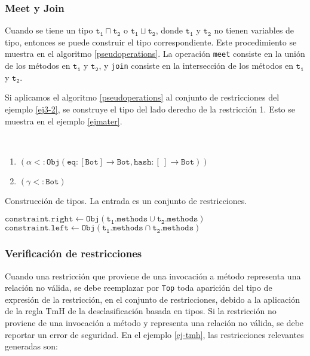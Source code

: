 \subsubsection{Meet y Join}
Cuando se tiene un tipo $\mathtt{t_1 \sqcap t_2}$ o $\mathtt{t_1 \sqcup t_2}$, donde $\mathtt{t_1}$ y $\mathtt{t_2}$ no tienen variables de tipo, entonces se puede construir el tipo correspondiente. Este procedimiento se muestra en el algoritmo \ref{pseudoperations}. La operación \texttt{meet} consiste en la unión de los métodos en $\mathtt{t_1}$ y $\mathtt{t_2}$, y \texttt{join} consiste en la intersección de los métodos en $\mathtt{t_1}$ y $\mathtt{t_2}$.

Si aplicamos el algoritmo \ref{pseudoperations} al conjunto de restricciones del ejemplo \ref{ej3-2}, se construye el tipo del lado derecho de la restricción 1. Esto se muestra en el ejemplo \ref{ejmater}.
\begin{ej}\
  \normalfont
  \label{ejmater}
  \begin{enumerate}
    \item $\mathtt{(\alpha <: Obj(eq : [Bot] \rightarrow Bot, hash : [\ ] \rightarrow Bot))}$
    \item $\mathtt{(\gamma <: Bot)}$
  \end{enumerate}
\end{ej}


\begin{algorithm}\captionsetup{labelsep=newline}
  \centering
  \caption{Construcción de tipos. La entrada es un conjunto de restricciones.}
  \label{pseudoperations}
    \begin{algorithmic}[1]
                \State $\mathtt{constraint.right\gets Obj(t_1.methods \cup t_2.methods)}$
              \EndCase
            \EndSwitch
                \State $\mathtt{constraint.left\gets Obj(t_1.methods \cap t_2.methods)}$
              \EndCase
            \EndSwitch
          \EndFor
      \EndFunction
    \end{algorithmic}
\end{algorithm}

\subsubsection{Verificación de restricciones} \label{propuestaVer}
Cuando una restricción que proviene de una invocación a método representa una relación no válida, se debe reemplazar por \texttt{Top} toda aparición del tipo de expresión de la restricción, en el conjunto de restricciones, debido a la aplicación de la regla $\text{TmH}$ de la desclasificación basada en tipos. Si la restricción no proviene de una invocación a método y representa una relación no válida, se debe reportar un error de seguridad. En el ejemplo \ref{ej-tmh}, las restricciones relevantes generadas son:

